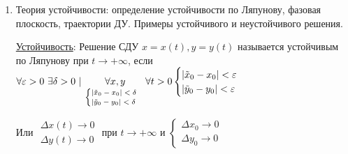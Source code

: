 \documentclass[12pt]{article}
\begin{document}
\begin{enumerate}
        \hyperlink{matrixmethod}{Матричный метод}: 

        
        $\begin{cases}
            y^{\prime}_1 = a_{11}y_1 + a_{12}y_2 + \dots + a_{1n} y_n \\
            \vdots \\
            y^{\prime}_n = a_{n1}y_n + a_{n2}y_2 + \dots + a_{nn} y_n
        \end{cases} \quad a_{ij} \in \Real$

        Обозначим $(y_1, \dots, y_n) = Y$ -- вектор функций, $\{a_{ij}\} = A$ -- матрица СДУ

        Тогда СДУ запишется в виде $Y^\prime = AY$ (однородная СДУ, так как нет $f(x)$)

        Пусть $\lambda_1, \dots, \lambda_n$ -- собственные числа $A$ и $h_i$ -- собственный вектор для $\lambda_i$

        Будем искать решение $Y$ в виде $Y = \ln e^{\lambda_i x}$

        Подставим в СДУ: $Y^\prime = \lambda_i h_i = e^{\lambda_i x} = A \underset{Y}{\undergroup{h_i e^{\lambda_i x}}} = AY$


        \item Теория устойчивости: определение устойчивости по Ляпунову, фазовая плоскость, траектории ДУ. Примеры устойчивого и неустойчивого решения.

        \hyperlink{stability}{Устойчивость}: Решение СДУ $x = x(t), y = y(t)$ называется устойчивым по Ляпунову при $t \to +\infty$, если
        $\forall \varepsilon > 0 \ \exists \delta > 0 \ | \ \underset{ \scriptsize \begin{cases}|\tilde{x}_0 - x_0| < \delta \\ |\tilde{y}_0 - y_0| < \delta\end{cases}}{\forall x, y} \forall t > 0 \begin{cases}|\tilde{x}_0 - x_0| < \varepsilon \\ |\tilde{y}_0 - y_0| < \varepsilon\end{cases}$

        Или $\begin{matrix}\Delta x (t) \to 0 \\ \Delta y (t) \to 0\end{matrix}$ при $t \to +\infty$ и $\begin{cases}\Delta x_0 \to 0 \\ \Delta y_0 \to 0\end{cases}$


    \end{enumerate}
\end{document}
